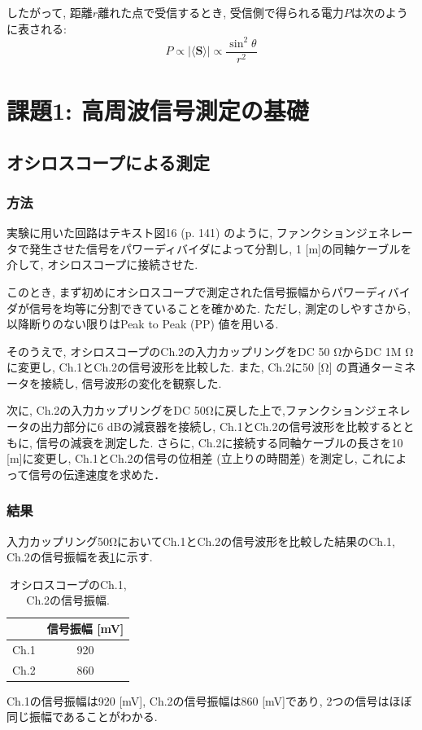 \documentclass[uplatex,dvipdfmx,a4j,12pt]{jsarticle}
\begin{document}
したがって, 距離$r$離れた点で受信するとき, 受信側で得られる電力$P$は次のように表される:
\begin{equation}
  P \propto |\langle \mathbf{S} \rangle| \propto \frac{\sin^2\theta}{r^2} \label{eq:power_received}
\end{equation}

\section{課題1: 高周波信号測定の基礎}
\subsection{オシロスコープによる測定}
\subsubsection{方法}
実験に用いた回路はテキスト図16 (p. 141) のように, ファンクションジェネレータで発生させた信号をパワーディバイダによって分割し, 1 [m]の同軸ケーブルを介して, オシロスコープに接続させた.

このとき, まず初めにオシロスコープで測定された信号振幅からパワーディバイダが信号を均等に分割できていることを確かめた.
ただし, 測定のしやすさから, 以降断りのない限りはPeak to Peak (PP) 値を用いる.

そのうえで, オシロスコープのCh.2の入力カップリングをDC 50 \si{\ohm}からDC 1M \si{\ohm}に変更し, Ch.1とCh.2の信号波形を比較した.
また, Ch.2に50 [\si{\ohm}] の貫通ターミネータを接続し, 信号波形の変化を観察した.

次に, Ch.2の入力カップリングをDC 50\si{\ohm}に戻した上で,ファンクションジェネレータの出力部分に6 dBの減衰器を接続し, Ch.1とCh.2の信号波形を比較するとともに, 信号の減衰を測定した.
さらに, Ch.2に接続する同軸ケーブルの長さを10 [m]に変更し, Ch.1とCh.2の信号の位相差 (立上りの時間差) を測定し, これによって信号の伝達速度を求めた．



\subsubsection{結果}
入力カップリング50\si{\ohm}においてCh.1とCh.2の信号波形を比較した結果のCh.1, Ch.2の信号振幅を表\ref{table:1-1-1}に示す.
\begin{table}[h]
    \centering
    \caption{オシロスコープのCh.1, Ch.2の信号振幅.}
    \label{table:1-1-1}
    \begin{tabular}{cc}
        \hline
        & 信号振幅 [mV]\\
        \hline\hline
        Ch.1 & 920  \\
        Ch.2 & 860  \\
        \hline
    \end{tabular}
\end{table}
Ch.1の信号振幅は920 [mV], Ch.2の信号振幅は860 [mV]であり, 2つの信号はほぼ同じ振幅であることがわかる.
\end{document}
